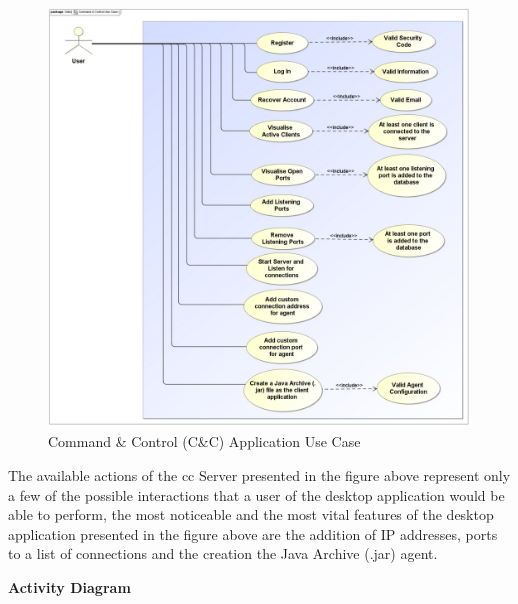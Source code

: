 \begin{figure}[h]
    \centering
    \includegraphics[width=1.0\textwidth, height=0.74\textheight]{images/command-control-use-case.pdf}
    \captionsetup{justification=centering}
    \caption[Command \& Control Application Use Case]{Command \& Control (C\&C) Application Use Case}
    \label{fig:command-use-case}
\end{figure}

The available actions of the \acrfull{cc} Server presented in the figure above represent only
a few of the possible interactions that a user of the desktop application would be able to perform, the most
noticeable and the most vital features of the desktop application presented in the figure above
are the addition of IP addresses, ports to a list of connections and the creation the Java Archive
(.jar) agent.

\newpage

\noindent
\textbf{Activity Diagram}

